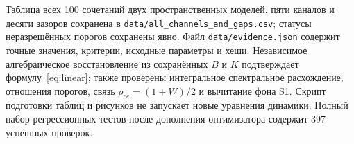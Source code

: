 Таблица всех 100 сочетаний двух пространственных моделей,
пяти каналов и десяти зазоров сохранена в
\texttt{data/all\_channels\_and\_gaps.csv}; статусы неразрешённых
порогов сохранены явно. Файл \texttt{data/evidence.json}
содержит точные значения, критерии, исходные параметры и хеши.
Независимое алгебраическое восстановление из сохранённых $B$ и $K$
подтверждает формулу~\eqref{eq:linear}; также проверены интегральное
спектральное расхождение, отношения порогов, связь
$\rho_{ee}=(1+W)/2$ и вычитание фона S1.
Скрипт подготовки таблиц и рисунков не запускает новые уравнения
динамики. Полный набор регрессионных тестов после дополнения
оптимизатора содержит 397 успешных проверок.
